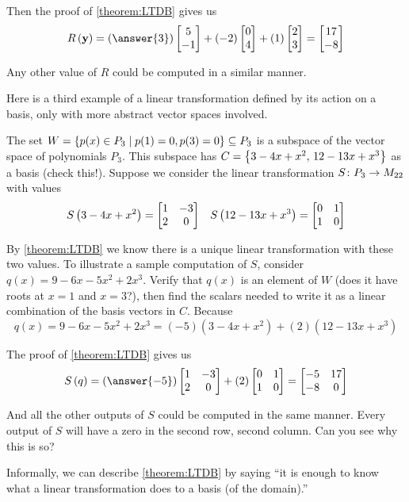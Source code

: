 \documentclass{ximera}
\begin{document}
\begin{example}
Then the proof of \ref{theorem:LTDB} gives us
\[
\lteval{R}{\vect{y}}=(\answer{3})\colvector{5\\-1}+ (-2)\colvector{0\\4}+ (1)\colvector{2\\3}= \colvector{17\\-8}
\]

Any other value of $R$ could be computed in a similar manner.

\end{example}

Here is a third example of a linear transformation defined by its action on a basis, only with more abstract vector spaces involved.



\begin{example}

The set $W=\left\{p(x)\in P_3\mid p(1)=0, p(3)=0\right\}\subseteq P_3$ is a subspace of the vector space of polynomials $P_3$.  This subspace has $C=\left\{3-4x+x^2,\,12-13x+x^3\right\}$ as a basis (check this!).  Suppose we consider the linear transformation $S\colon P_3\rightarrow M_{22}$ with values
\begin{align*}
S\left(3-4x+x^2\right)=\begin{bmatrix}1&-3\\2&0\end{bmatrix}&&
S\left(12-13x+x^3\right)=\begin{bmatrix}0&1\\1&0\end{bmatrix}
\end{align*}




By \ref{theorem:LTDB} we know there is a unique linear transformation with these two values.  To illustrate a sample computation of $S$, consider $q(x)=9-6x-5x^2+2x^3$.  Verify that $q(x)$ is an element of $W$ (does it have roots at $x=1$ and $x=3$?), then find the scalars needed to write it as a linear combination of the basis vectors in $C$.  Because
\[
q(x)=9-6x-5x^2+2x^3=(-5)(3-4x+x^2)+(2)(12-13x+x^3)
\]




The proof of \ref{theorem:LTDB} gives us
\[
\lteval{S}{q}=(\answer{-5})\begin{bmatrix}1&-3\\2&0\end{bmatrix}
+
(2)\begin{bmatrix}0&1\\1&0\end{bmatrix}
=
\begin{bmatrix}-5&17\\-8&0\end{bmatrix}
\]


And all the other outputs of $S$ could be computed in the same manner.  Every output of $S$ will have a zero in the second row, second column.  Can you see why this is so?


\end{example}

Informally, we can describe \ref{theorem:LTDB} by saying ``it is enough to know what a linear transformation does to a basis (of the domain).''
\end{document}
